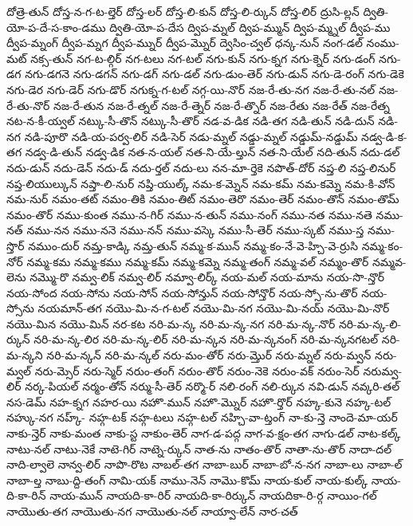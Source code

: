 {దోత్రె-తున్
దోస్త-న-గ-ట-ల్తెర్
దోస్త-లర్
దోస్త-లి-కున్
దోస్త-లి-ర్కున్
దోస్త-లిర్
ద్రుసి-ల్లన్
ద్వితి-యో-ప-దే-స-కాం-డము
ద్వితి-యో-ప-దేస
ద్విప-మ్నల్
ద్విప-మ్మున్
ద్విప-మ్మ్నల్
ద్వీప-ము
ద్వీప-మ్నంగ్
ద్వీప-మ్నగ
ద్వీప-మ్నుర్
ద్వీప-మ్నొర్
ద్వెసిం-చ్వల్
ధన్క-నున్
నంగ-డల్
నంము-మట్
నక్స-తున్
నగ-ట-ల్గిర్
నగ-టలు
నగ-టల్
నగు-కున్
నగు-క్నగ
నగు-క్నెర్
నగు-డంగ్
నగు-డగ
నగు-డగనె
నగు-డగన్
నగు-డగ్
నగు-డల్
నగు-డుం-తెర్
నగు-డున్
నగు-డె-రంగ్
నగు-డెకె
నగు-డెర
నగు-డెర్
నగు-డొర్
నగుక్న-గ-టల్
నగ్గ-యి-నొర్
నజ-రే-తు-నగ
నజ-రే-తు-నల్
నజ-రే-తు-నొర్
నజ-రే-తున
నజ-రే-త్నల్
నజ-రే-త్నెర్
నజ-రే-త్నొర్
నజ-రేతు
నజ-రేత్
నజ-రేత్న
నట-న-కీ-య్వల్
నట్కు-సీ-తొన్
నట్కు-సీ-తొర్
నడ-వ-డిక
నడి-తగ
నడి-తున్
నడి-దున్
నడి-నగ
నడి-పూరొ
నడి-య-పర్వ-లిర్
నడి-సెర్
నడు-మ్నల్
నడ్డు-మ్నల్
నడ్డుమ్-నడ్డుమ్
నడ్వ-డి-క-తగ
నడ్వ-డి-తున్
నడ్వ-డిక
నత-న-యల్
నత-ని-యే-ల్తున్
నత-ని-యేల్
నది-తున్
నదు-డల్
నదు-డున్
నదు-డెన్
నదు-డ్
నదు-ర్తల్
నదు-లు
నన-మా-ర్తెకె
నపొత్-దోర్
నప్త-లి
నప్త-లినుర్
నప్త-లియుల్కున్
నప్తా-లి-నుర్
నప్తి-యుల్క్
నమ-క-మ్నెన్
నమ-కమ్
నమ-కమ్నె
నమ-కి-వోన్
నమ-నుర్
నమం-తట్
నమం-తికి
నమం-తిట్
నమం-తెరొ
నమం-తెర్
నమం-తొన్
నమం-తొమ్
నమం-తొర్
నము-కుంత
నము-న-గిర్
నము-న-తున్
నము-నంగ్
నము-నత
నము-నతె
నము-నత్
నము-నన
నము-ననె
నము-నన్
నము-వస్కె
నము-సీ-తెర్
నము-స్కట్
నము-స్త
నము-స్తొర్
నముం-దుర్
నమ్త-కాడ్కి
నమ్త-తున్
నమ్మ-క-మున్
నమ్మ-కం-నే-వె-హ్చి-వె-ర్రుసి
నమ్మ-కం-నోర్
నమ్మ-కమ
నమ్మ-కము
నమ్మ-కమ్
నమ్మ-కమ్నె
నమ్మ-తంగ్
నమ్మ-వల్
నమ్మం-తొర్
నమ్మవ-లెను
నమ్మొ-రొ
నమ్వ-లిక్
నమ్వ-లిర్
నమ్వా-లిర్క్
నయ-మల్
నయ-మాను
నయ-సొ-న్తొర్
నయ-సోంద
నయ-సోను
నయ-సోన్
నయ-సోన్తున్
నయ-సోన్తొర్
నయ-స్సో-ను-తొర్
నయ-స్సోను
నయమాన్-తగ
నయొ-మి-న-గ-టల్
నయొ-మి-నగ
నయొ-మి-నయ్
నయొ-మి-నొర్
నయొ-మిన
నయొ-మిన్
నర-కట
నరి-మ-న్క
నరి-మ-న్క-నగ
నరి-మ-న్క-నొర్
నరి-మ-న్క-లి-ర్కున్
నరి-మ-న్క-లిర
నరి-మ-న్క-లిర్
నరి-మ-న్కన
నరి-మ-న్కనంగ్
నరి-మ-న్కనగటల్
నరి-మ-న్కని
నరి-మ-న్కన్
నరి-మ-న్కల్
నరు-మం-తోర్
నరు-మ్తొర్
నరు-మ్నల్
నరు-మ్వన్
నరు-మ్వల్
నరు-మ్సెర్
నరు-స్మెర్
నరుం-తంగ్
నరుం-తొర్
నరుం-నెకె
నరుం-వక్
నరుం-సెర్
నరుమ్వ-లిర్
నర్క-పియల్
నర్మం-తోన్
నర్ము-సీ-తెర్
నర్మొ-ర్
నలి-రంగ్
నలి-ర్కున
నవి-డున్
నవ్కరి-తల్
నస-డెమ్
నహ-క్నగ
నహర-యి
నహొ-మున్
నహొ-మ్నొర్
నహొ-ర్తొర్
నహ్క-కునె
నహ్క-టల్
నహ్కు-నగ
నహ్క్-
నహ్గ-టక్
నహ్గ-టలు
నహ్గ-టల్
నహ్చి-వా-ట్తంగ్
నా-కు-న్తె
నాందె-మా-యర్
నాకు-న్తెర్
నాకు-మంత
నాకు-స్ట
నాకుం-తెర్
నాగ-డ-పద్గ
నాగ-వ-క్షం-తగ
నాగు-డల్
నాట-కల్క్
నాటు-నల్
నాటు-నెకే
నాటె-గిర్
నాట్నె-ర్కున్
నాత-ను
నాతం-తొర్
నాతా-ను-తొర్
నాదా-దల్
నాది-ల్వాలె
నాన్వ-లిర్
నాపొ-రొట
నాబల్-తగ
నాబా-బుర్
నాబా-బో-న-నగ
నాబా-లు
నాబా-ల్
నాబా-ల్త
నాబు-ద్ది-తంగ్
నామి-యక్
నాము-నెన్
నామొ-కొమ్
నాయ-కుల్
నాయ-కుల్క్
నాయ-ది-కా-రిన్
నాయ-మున్
నాయది-కా-రిర్
నాయది-కా-రిర్కున్
నాయదికా-రి-ర్గ
నాయిం-గల్
నాయొతు-తగ
నాయొతు-నగ
నాయొతు-నల్
నాయ్వా-లేన్
నార-చత్
}
